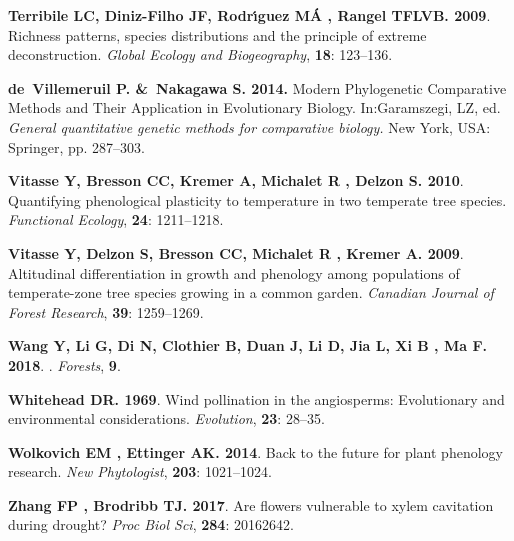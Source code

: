 \documentclass[11pt]{article}
\begin{document}
\begin{thebibliography}{48}
{\bf Terribile LC, Diniz-Filho JF, Rodr{\'\i}guez M{\'A} , Rangel TFLVB}{\bf .
  2009}.
\newblock Richness patterns, species distributions and the principle of extreme
  deconstruction.
\newblock \emph{Global Ecology and Biogeography}, {\bf 18}: 123--136.

{\bf de~Villemeruil P. &~Nakagawa S. 2014.}
\newblock Modern Phylogenetic Comparative Methods and Their Application
  in Evolutionary Biology. In:Garamszegi, LZ, ed. \emph{General quantitative
  genetic methods for comparative biology.} New York, USA: Springer, pp. 287--303.

{\bf Vitasse Y, Bresson CC, Kremer A, Michalet R , Delzon S}{\bf . 2010}.
\newblock Quantifying phenological plasticity to temperature in two temperate
  tree species.
\newblock \emph{Functional Ecology}, {\bf 24}: 1211--1218.

{\bf Vitasse Y, Delzon S, Bresson CC, Michalet R , Kremer A}{\bf . 2009}.
\newblock Altitudinal differentiation in growth and phenology among populations
  of temperate-zone tree species growing in a common garden.
\newblock \emph{Canadian Journal of Forest Research}, {\bf 39}: 1259--1269.

{\bf Wang Y, Li G, Di N, Clothier B, Duan J, Li D, Jia L, Xi B , Ma F}{\bf .
  {2018}}.
.
\newblock \emph{{Forests}}, {\bf {9}}.

{\bf Whitehead DR}{\bf . 1969}.
\newblock Wind pollination in the angiosperms: Evolutionary and environmental
  considerations.
\newblock \emph{Evolution}, {\bf 23}: 28--35.

{\bf Wolkovich EM , Ettinger AK}{\bf . 2014}.
\newblock Back to the future for plant phenology research.
\newblock \emph{New Phytologist}, {\bf 203}: 1021--1024.

{\bf Zhang FP , Brodribb TJ}{\bf . 2017}.
\newblock Are flowers vulnerable to xylem cavitation during drought?
\newblock \emph{Proc Biol Sci}, {\bf 284}: 20162642.

\end{thebibliography}
\end{document}

